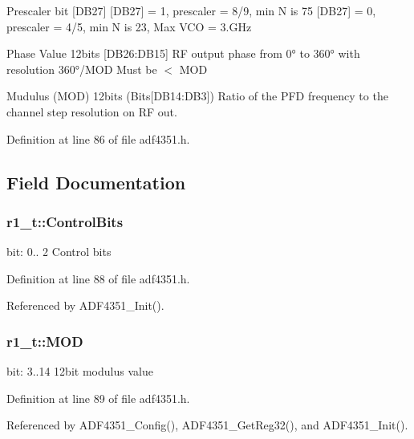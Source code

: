 Prescaler bit \mbox{[}D\+B27\mbox{]} \mbox{[}D\+B27\mbox{]} = 1, prescaler = 8/9, min N is 75 \mbox{[}D\+B27\mbox{]} = 0, prescaler = 4/5, min N is 23, Max V\+CO = 3.\+G\+Hz

Phase Value 12bits \mbox{[}D\+B26\+:D\+B15\mbox{]} RF output phase from 0° to 360° with resolution 360°/\+M\+OD Must be $<$ M\+OD

Mudulus (M\+OD) 12bits (Bits\mbox{[}D\+B14\+:D\+B3\mbox{]}) Ratio of the P\+FD frequency to the channel step resolution on RF out. 

Definition at line 86 of file adf4351.\+h.



\subsection{Field Documentation}
\subsubsection[{\texorpdfstring{Control\+Bits}{ControlBits}}]{ r1\+\_\+t\+::\+Control\+Bits}\hypertarget{structr1__t_a5335bbd53d06ad7afb879d919033404c}{}\label{structr1__t_a5335bbd53d06ad7afb879d919033404c}
bit\+: 0.. 2 Control bits 

Definition at line 88 of file adf4351.\+h.



Referenced by A\+D\+F4351\+\_\+\+Init().

\subsubsection[{\texorpdfstring{M\+OD}{MOD}}]{ r1\+\_\+t\+::\+M\+OD}\hypertarget{structr1__t_a9ea14fcf64bbacfbcfa5afa992c0b87d}{}\label{structr1__t_a9ea14fcf64bbacfbcfa5afa992c0b87d}
bit\+: 3..14 12bit modulus value 

Definition at line 89 of file adf4351.\+h.



Referenced by A\+D\+F4351\+\_\+\+Config(), A\+D\+F4351\+\_\+\+Get\+Reg32(), and A\+D\+F4351\+\_\+\+Init().

